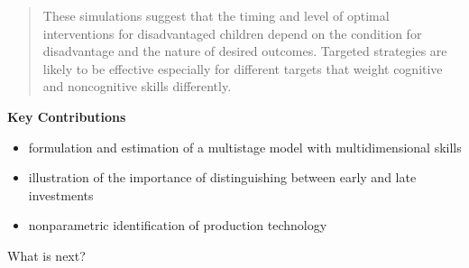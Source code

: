 \begin{frame}
\begin{quote}
These simulations suggest that the timing and level of optimal interventions for disadvantaged children depend on the condition for disadvantage and the nature of desired outcomes. Targeted strategies are likely to be effective especially for different targets that weight cognitive and noncognitive skills differently.
\end{quote}
\end{frame}
\begin{frame}\textbf{Key Contributions}\vspace{0.3cm}

\begin{itemize}\setlength\itemsep{1em}
\item formulation and estimation of a multistage model with multidimensional skills
\item illustration of the importance of distinguishing between early and late investments
\item nonparametric identification of production technology
\end{itemize}\vspace{0.3cm}

What is next?

\end{frame}
